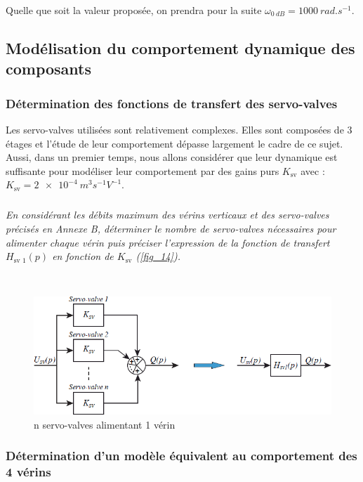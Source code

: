 \documentclass[10pt,fleqn]{article} %
\begin{document}
Quelle que soit la valeur proposée, on prendra pour la suite $\omega_{\SI{0}{dB}} = \SI{1000}{rad.s^{-1}}$.

\subsection{Modélisation du comportement dynamique des composants}

\subsubsection{Détermination des fonctions de transfert des servo-valves}

Les servo-valves utilisées sont relativement complexes. Elles sont composées de 3 étages et l’étude de leur
comportement dépasse largement le cadre de ce sujet. Aussi, dans un premier temps, nous allons considérer
que leur dynamique est suffisante pour modéliser leur comportement par des gains purs $K_{\text{sv}}$ avec :
$K_{\text{sv}} = \SI{2e-4}{m^3s^{-1}V^{-1}}$.


\subparagraph{\label{q_}}\textit{En considérant les débits maximum des vérins verticaux et des servo-valves précisés en Annexe
B, déterminer le nombre de servo-valves nécessaires pour alimenter chaque vérin puis préciser
l’expression de la fonction de transfert $H_{\text{sv 1}}(p)$ en fonction de $K_{\text{sv}}$ (\autoref{fig_14}).}
\ifprof
\begin{corrige} ~\\

\end{corrige}
\else
\fi


\begin{figure}[H]
\centering
\includegraphics[width=0.7\linewidth]{fig_14}
\caption{n servo-valves alimentant 1 vérin \label{fig_14}}
\end{figure}


\subsubsection{Détermination d’un modèle équivalent au comportement des 4 vérins}
\end{document}
